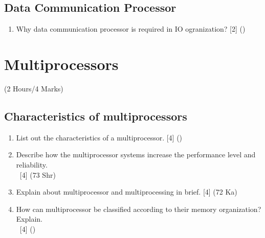 \documentclass[12pt]{article}
\newcommand{\enter}{\\\textcolor{white}{1}}
\begin{document}
	\subsection{Data Communication Processor}
		\begin{enumerate}
			\item Why data communication processor is required in IO ogranization? \hfill [2] ()		
		\end{enumerate}


\pagebreak
\section{Multiprocessors}
	\begin{center}(2 Hours/4 Marks)\end{center}
	\subsection{Characteristics of multiprocessors}
		\begin{enumerate}
			\item List out the characteristics of a multiprocessor. \hfill [4] ()

			\item Describe how the multiprocessor systems increase the performance level and reliability.
			\enter\hfill [4] (73 Shr)

			\item Explain about multiprocessor and multiprocessing in brief. \hfill [4] (72 Ka)

			\item How can multiprocessor be classified according to their memory organization? Explain.
			\enter\hfill [4] ()
		\end{enumerate}
\end{document}
